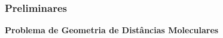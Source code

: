 \documentclass{beamer}
\begin{document}
\begin{frame}
\frametitle{\normalsize Preliminares}
	\large \textbf{Problema de Geometria de Distâncias Moleculares}

\begin{figure}
	\vspace{-0.2cm}
	\\
	\vspace{-0.2cm}
\end{figure}
\end{frame}
\end{document}
